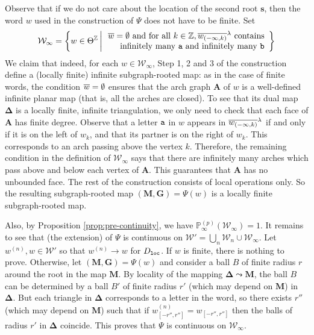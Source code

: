 \documentclass[a4paper]{article}
\newcommand*{\map}{\mathbf}
\newcommand*{\W}{\mathcal{W}}
\newcommand*{\m}{\map{M}}
\begin{document}
\proof Observe that if we do not care about the location of the second root $\map{s}$, then the word $w$ used in the construction of $\Psi$ does not have to be finite.
Set
\begin{equation}\label{eq:W infty}
	\W_\infty = \set{w\in\Theta^\integer}{
	\begin{array}{r}
	\rd{w}=\emptystr\text{ and for all } k\in\integer,\rdb{w_{(-\infty,k)}}\text{ contains}
\\	\text{infinitely many }\xa\text{ and infinitely many }\xb 
	\end{array}
	}
\end{equation}
We claim that indeed, for each $w\in \W_\infty$, Step 1, 2 and 3 of the construction define a (locally finite) infinite subgraph-rooted map: as in the case of finite words, the condition $\overline{w}=\emptyset$ ensures that the arch graph $\map{A}$ of $w$ is a well-defined infinite planar map (that is, all the arches are closed).
To see that its dual map $\map{\Delta}$ is a locally finite, infinite triangulation, we only need to check that each face of $\map{A}$ has finite degree.
Observe that a letter $\mathtt{a}$ in $w$ appears in $\overline{w_{(-\infty,k)}}^\lambda$ if and only if it is on the left of $w_k$, and that its partner is on the right of $w_k$.
This corresponds to an arch passing above the vertex $k$.
Therefore, the remaining condition in the definition of $\W_\infty$ says that there are infinitely many arches which pass above and below each vertex of $\map{A}$.
This guarantees that $\map{A}$ has no unbounded face.
The rest of the construction consists of local operations only.
So the resulting subgraph-rooted map $(\map{M,G}) = \Psi(w)$ is a locally finite subgraph-rooted map.

Also, by Proposition \ref{prop:pre-continuity}, we have $ \mathbb{P}_{\infty}^{(p)}( \mathcal{W}_{\infty})=1$.  It remains to see that (the extension) of $\Psi$ is continuous on $  \mathcal{W}'=\bigcup_{n} \mathcal{W}_{n} \cup \mathcal{W}_{\infty}$. Let $w^{(n)}, w \in \mathcal{W}'$ so that $w^{(n)} \to w$ for $D_{\mathtt{loc}}$. If $w$ is finite, there is nothing to prove. Otherwise, let $(\map{M,G})=\Psi(w)$ and consider a ball $B$ of finite radius $r$ around the root in the map $\m $. By locality of the mapping $\map{\Delta}\leadsto\m $, the ball $B$ can be determined by a ball $B'$ of finite radius $r'$ (which may depend on $ \mathbf{M}$) in $\map{\Delta}$.
But each triangle in $\map{\Delta}$ corresponds to a letter in the word, so
there exists $r''$ (which may depend on $\mathbf{M}$) such that if $w^{(n)}_{[-r'',r'']}= w_{[-r'',r'']}$ then the balls of radius $r'$ in $\map{\Delta}$ coincide.
This proves that $\Psi$ is continuous on $\W_\infty$.
\endproof
\end{document}
